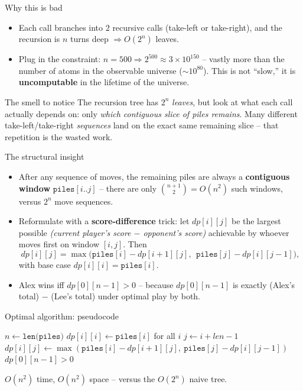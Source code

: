 \documentclass[11pt,aspectratio=169]{beamer}
\begin{document}
\begin{frame}{Why this is bad}
  \begin{itemize}
    \item Each call branches into $2$ recursive calls (take-left or take-right), and
    the recursion is $n$ turns deep $\Rightarrow O(2^n)$ leaves.
    \item Plug in the constraint: $n = 500 \Rightarrow 2^{500} \approx 3\times 10^{150}$
    -- vastly more than the number of atoms in the observable universe ($\sim 10^{80}$).
    This is not ``slow,'' it is \textbf{uncomputable} in the lifetime of the universe.
  \end{itemize}
  \begin{alertblock}{The smell to notice}
    The recursion tree has $2^n$ \emph{leaves}, but look at what each call actually
    depends on: only \emph{which contiguous slice of piles remains}. Many different
    take-left/take-right \emph{sequences} land on the exact same remaining slice --
    that repetition is the wasted work.
  \end{alertblock}
\end{frame}

\begin{frame}{The structural insight}
  \begin{itemize}
    \item After any sequence of moves, the remaining piles are always a
    \textbf{contiguous window} $\texttt{piles}[i..j]$ -- there are only
    $\binom{n+1}{2} = O(n^2)$ such windows, versus $2^n$ move sequences.
    \item Reformulate with a \textbf{score-difference} trick: let $dp[i][j]$ be the
    largest possible \emph{(current player's score $-$ opponent's score)} achievable by
    whoever moves first on window $[i,j]$. Then
    \[
      dp[i][j] = \max\big(\texttt{piles}[i] - dp[i{+}1][j],\ \ \texttt{piles}[j] -
      dp[i][j{-}1]\big),
    \]
    with base case $dp[i][i] = \texttt{piles}[i]$.
    \item Alex wins iff $dp[0][n-1] > 0$ -- because $dp[0][n-1]$ is exactly
    (Alex's total) $-$ (Lee's total) under optimal play by both.
  \end{itemize}
\end{frame}

\begin{frame}{Optimal algorithm: pseudocode}
  \footnotesize
  \begin{algorithmic}[1]
      \State $n \gets \texttt{len(piles)}$
      \State $dp[i][i] \gets \texttt{piles}[i]$ for all $i$ 
       
          \State $j \gets i + \textit{len} - 1$
          \State $dp[i][j] \gets \max(\texttt{piles}[i] - dp[i{+}1][j],\ \texttt{piles}[j]
          - dp[i][j{-}1])$
        \EndFor
      \EndFor
      \State \Return $dp[0][n-1] > 0$
    \EndFunction
  \end{algorithmic}
  $O(n^2)$ time, $O(n^2)$ space -- versus the $O(2^n)$ naive tree.
\end{frame}
\end{document}
